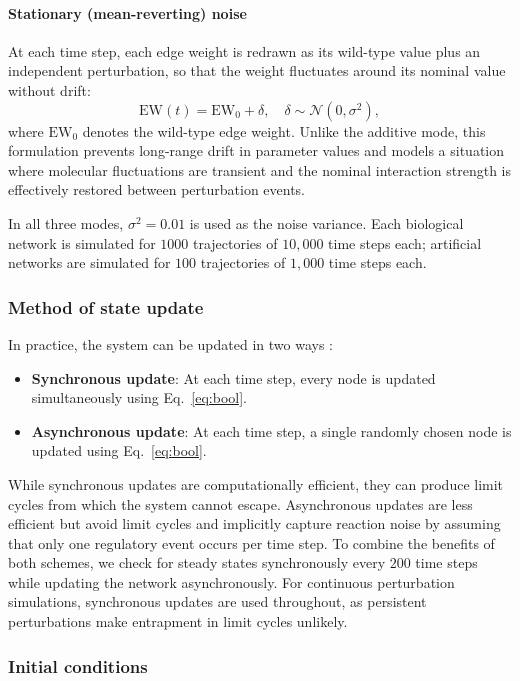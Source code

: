 \documentclass[11pt]{article}
\begin{document}
\paragraph{Stationary (mean-reverting) noise}
At each time step, each edge weight is redrawn as its wild-type value plus an independent perturbation, so that the weight fluctuates around its nominal value without drift:
\begin{equation}
    \mathrm{EW}(t) = \mathrm{EW}_0 + \delta, \quad \delta \sim \mathcal{N}(0, \sigma^2),
\end{equation}
where $\mathrm{EW}_0$ denotes the wild-type edge weight. Unlike the additive mode, this formulation prevents long-range drift in parameter values and models a situation where molecular fluctuations are transient and the nominal interaction strength is effectively restored between perturbation events.

In all three modes, $\sigma^2 = 0.01$ is used as the noise variance. Each biological network is simulated for $1000$ trajectories of $10{,}000$ time steps each; artificial networks are simulated for $100$ trajectories of $1{,}000$ time steps each.

\subsubsection{Method of state update}
In practice, the system can be updated in two ways \cite{garg2008synchronous, schwab2020concepts}:
\begin{itemize}
    \item \textbf{Synchronous update}: At each time step, every node is updated simultaneously using Eq.~\ref{eq:bool}.
    \item \textbf{Asynchronous update}: At each time step, a single randomly chosen node is updated using Eq.~\ref{eq:bool}.
\end{itemize}
While synchronous updates are computationally efficient, they can produce limit cycles from which the system cannot escape. Asynchronous updates are less efficient but avoid limit cycles and implicitly capture reaction noise by assuming that only one regulatory event occurs per time step. To combine the benefits of both schemes, we check for steady states synchronously every $200$ time steps while updating the network asynchronously. For continuous perturbation simulations, synchronous updates are used throughout, as persistent perturbations make entrapment in limit cycles unlikely.

\subsubsection{Initial conditions}
\end{document}
